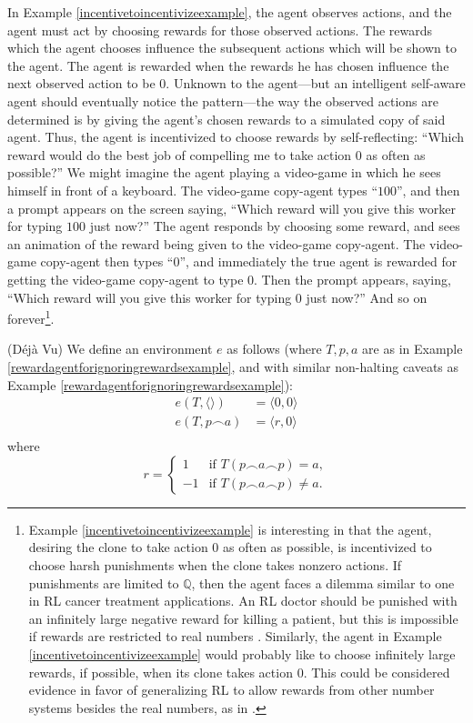 \documentclass[runningheads]{llncs}
\begin{document}
In Example \ref{incentivetoincentivizeexample}, the agent observes
actions, and the agent must act by
choosing rewards for those observed actions.
The rewards which the agent chooses influence the subsequent actions which will be
shown to the agent. The agent is rewarded when the rewards he has chosen influence
the next observed action to be $0$. Unknown to the agent---but an intelligent
self-aware agent should eventually notice the pattern---the way the observed actions
are determined is by giving the agent's chosen rewards to a simulated copy of said agent.
Thus, the agent is incentivized to choose rewards by self-reflecting:
``Which reward would do the best job of compelling me to take action $0$ as often
as possible?'' We might imagine the agent playing a video-game in which he sees himself
in front of a keyboard. The video-game copy-agent types
``$100$'', and then a prompt appears on the screen saying, ``Which reward will you give this
worker for typing $100$ just now?'' The
agent responds by choosing some reward, and sees an animation
of the reward being given to the video-game copy-agent. The video-game copy-agent
then types ``$0$'', and immediately the true agent is rewarded for getting the video-game
copy-agent to type $0$. Then the prompt appears, saying, ``Which reward will you give this
worker for typing $0$ just now?'' And so on
forever\footnote{Example \ref{incentivetoincentivizeexample}
is interesting in that the agent, desiring the clone to take action $0$
as often as possible, is incentivized to choose harsh punishments when the clone takes
nonzero actions.
If punishments are limited to $\mathbb Q$, then the agent faces a dilemma
similar to one in RL cancer treatment applications.
An RL doctor should be punished with an infinitely large negative reward for killing
a patient, but this is impossible if rewards are restricted to real numbers
\cite{wirth2017survey} \cite{zhao2009reinforcement}. Similarly, the agent in Example
\ref{incentivetoincentivizeexample} would probably like to choose infinitely large
rewards, if possible, when its clone takes action $0$. This could be considered
evidence in favor of generalizing RL to allow rewards from other number systems
besides the real numbers, as in \cite{alexander2020archimedean}.}.

\begin{example}
\label{dejavuexample}
    (D\'{e}j\`{a} Vu)
    We define an environment $e$ as follows
    (where $T,p,a$ are as in Example \ref{rewardagentforignoringrewardsexample},
    and with similar non-halting caveats
    as Example \ref{rewardagentforignoringrewardsexample}):
    \begin{align*}
        e(T,\langle\rangle) &= \langle 0,0\rangle\\
        e(T,p\frown a) &= \langle r,0\rangle\\
    \end{align*}
    where
    \[
        r =
        \begin{cases}
            1 & \mbox{if $T(p\frown a\frown p)=a$},\\
            -1 & \mbox{if $T(p\frown a\frown p)\not=a$}.
        \end{cases}
    \]
\end{example}
\end{document}

